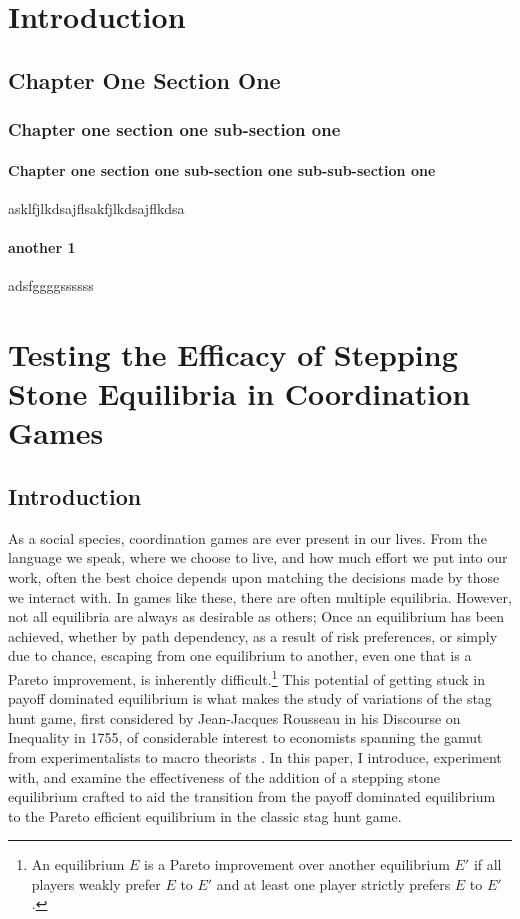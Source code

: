 \chapter{Introduction}
\section{Chapter One Section One}
\subsection{Chapter one section one sub-section one}
\subsubsection{Chapter one section one sub-section one sub-sub-section one}
asklfjlkdsajflsakfjlkdsajflkdsa
\subsubsection{another 1}
adsfggggssssss

\chapter{Testing the Efficacy of Stepping Stone Equilibria in Coordination Games}

\section{Introduction}


As a social species, coordination games are ever present in our lives. From the language we speak, where we choose to live, and how much effort we put into our work, often the best choice depends upon matching the decisions made by those we interact with. In games like these, there are often multiple equilibria. However, not all equilibria are always as desirable as others; Once an equilibrium has been achieved, whether by path dependency, as a result of risk preferences, or simply due to chance, escaping from one equilibrium to another, even one that is a Pareto improvement, is inherently difficult.\footnote{An equilibrium $E$ is a Pareto improvement over another equilibrium $E'$ if all players weakly prefer $E$ to $E'$ and at least one player strictly prefers $E$ to $E'$.} This potential of getting stuck in payoff dominated equilibrium is what makes the study of variations of the stag hunt game, first considered by Jean-Jacques Rousseau in his Discourse on Inequality in 1755, of considerable interest to economists spanning the gamut from experimentalists to macro theorists \citep{cooper1988coordinating, romer1996advanced, bryant1983simple}. In this paper, I introduce, experiment with, and examine the effectiveness of the addition of a stepping stone equilibrium crafted to aid the transition from the payoff dominated equilibrium to the Pareto efficient equilibrium in the classic stag hunt game.

